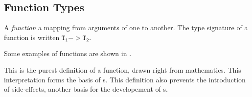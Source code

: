 \subsection{Function Types}\label{subsec:Function_Types}
\begin{definition}[Function]\label{def:Function}
  A \emph{function} a mapping from arguments of one  to another.
  The type signature of a function is written $\mathtt{T_{1}} -> \mathtt{T_{2}}$.

  Some examples of functions are shown in .

  \begin{remark}\label{rmk:Function_Definition_Pureness}
    This is the purest definition of a function, drawn right from mathematics.
    This interpretation forms the basis of s.
    This definition also prevents the introduction of side-effects, another basis for the developement of s.
  \end{remark}
\end{definition}

